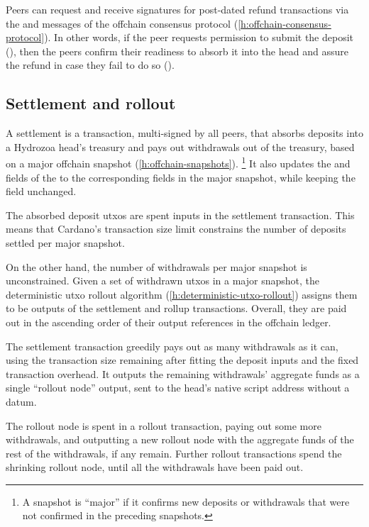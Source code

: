 \documentclass[../hydrozoa.tex]{subfiles}
\begin{document}
Peers can request and receive signatures for post-dated refund transactions via the  and  messages of the offchain consensus protocol (\cref{h:offchain-consensus-protocol}).
In other words, if the peer requests permission to submit the deposit (), then the peers confirm their readiness to absorb it into the head and assure the refund in case they fail to do so ().

\subsection{Settlement and rollout}%
\label{h:multisig-settle}
A settlement is a transaction, multi-signed by all peers, that absorbs deposits into a Hydrozoa head's treasury and pays out withdrawals out of the treasury, based on a major offchain snapshot (\cref{h:offchain-snapshots}).%
\footnote{A snapshot is ``major'' if it confirms new deposits or withdrawals that were not confirmed in the preceding snapshots.}
It also updates the  and  fields of the  to the corresponding fields in the major snapshot, while keeping the  field unchanged.

The absorbed deposit utxos are spent inputs in the settlement transaction.
This means that Cardano's transaction size limit constrains the number of deposits settled per major snapshot.

On the other hand, the number of withdrawals per major snapshot is unconstrained.
Given a set of withdrawn utxos in a major snapshot, the deterministic utxo rollout algorithm (\cref{h:deterministic-utxo-rollout}) assigns them to be outputs of the settlement and rollup transactions.
Overall, they are paid out in the ascending order of their output references in the offchain ledger.

The settlement transaction greedily pays out as many withdrawals as it can, using the transaction size remaining after fitting the deposit inputs and the fixed transaction overhead.
It outputs the remaining withdrawals' aggregate funds as a single ``rollout node'' output, sent to the head's native script address without a datum.

The rollout node is spent in a rollout transaction, paying out some more withdrawals, and outputting a new rollout node with the aggregate funds of the rest of the withdrawals, if any remain.
Further rollout transactions spend the shrinking rollout node, until all the withdrawals have been paid out.
\end{document}

